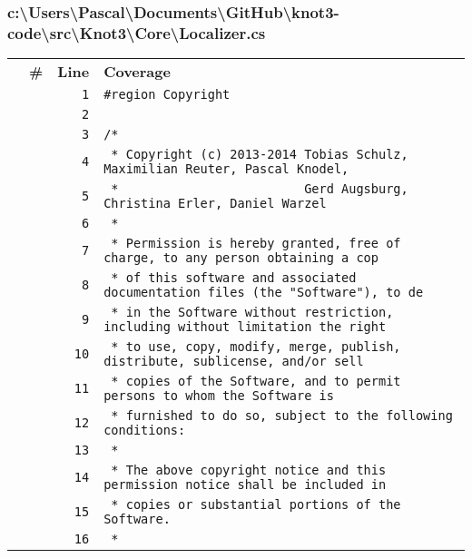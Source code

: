 \documentclass[a4paper,10pt]{article}
\begin{document}
\subsubsection{c:\textbackslash Users\textbackslash Pascal\textbackslash Documents\textbackslash GitHub\textbackslash knot3-code\textbackslash src\textbackslash Knot3\textbackslash Core\textbackslash Localizer.cs}
\begin{longtable}[l]{lrrl}
\textbf{} & \textbf{\#} & \textbf{Line} & \textbf{Coverage}\\
\cellcolor{gray} &  & \verb~1~ & \verb~#region Copyright~\\
\cellcolor{gray} &  & \verb~2~ & \verb~~\\
\cellcolor{gray} &  & \verb~3~ & \verb~/*~\\
\cellcolor{gray} &  & \verb~4~ & \verb~ * Copyright (c) 2013-2014 Tobias Schulz, Maximilian Reuter, Pascal Knodel,~\\
\cellcolor{gray} &  & \verb~5~ & \verb~ *                         Gerd Augsburg, Christina Erler, Daniel Warzel~\\
\cellcolor{gray} &  & \verb~6~ & \verb~ *~\\
\cellcolor{gray} &  & \verb~7~ & \verb~ * Permission is hereby granted, free of charge, to any person obtaining a cop~\\
\cellcolor{gray} &  & \verb~8~ & \verb~ * of this software and associated documentation files (the "Software"), to de~\\
\cellcolor{gray} &  & \verb~9~ & \verb~ * in the Software without restriction, including without limitation the right~\\
\cellcolor{gray} &  & \verb~10~ & \verb~ * to use, copy, modify, merge, publish, distribute, sublicense, and/or sell~\\
\cellcolor{gray} &  & \verb~11~ & \verb~ * copies of the Software, and to permit persons to whom the Software is~\\
\cellcolor{gray} &  & \verb~12~ & \verb~ * furnished to do so, subject to the following conditions:~\\
\cellcolor{gray} &  & \verb~13~ & \verb~ *~\\
\cellcolor{gray} &  & \verb~14~ & \verb~ * The above copyright notice and this permission notice shall be included in ~\\
\cellcolor{gray} &  & \verb~15~ & \verb~ * copies or substantial portions of the Software.~\\
\cellcolor{gray} &  & \verb~16~ & \verb~ *~\\

\end{longtable}
\end{document}
